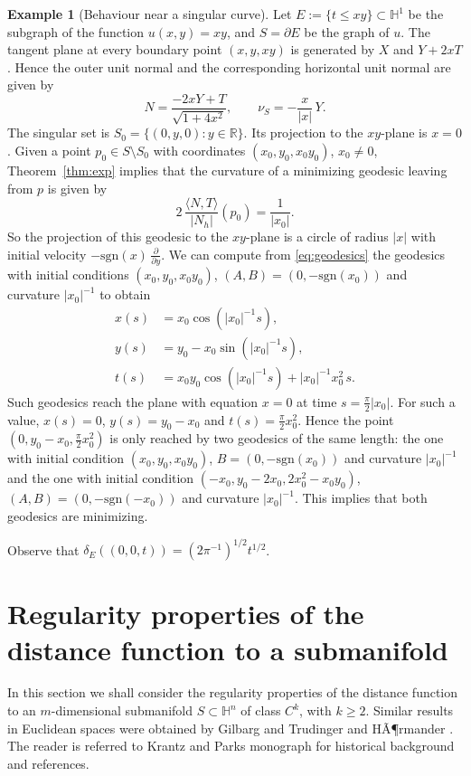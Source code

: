 \documentclass[10pt]{amsart}
\theoremstyle{definition}
\newtheorem{example}[theorem]{Example}
\theoremstyle{remark}
\numberwithin{equation}{section}
\begin{document}
\begin{example}[Behaviour near a singular curve]
\label{ex:curve}
Let $E:=\{t{\leqslant} xy\}\subset{{\mathbb{H}}}^1$ be the subgraph of the function $u(x,y)=xy$, and $S={\partial} E$ be the graph of $u$. The tangent plane at every boundary point $(x,y,xy)$ is generated by $X$ and $Y+2xT$. Hence the outer unit normal and the corresponding horizontal unit normal are given by
\[
N=\frac{-2xY+T}{\sqrt{1+4x^2}},\qquad \nu_S=-\frac{x}{|x|}\,Y.
\]
The singular set is $S_0=\{(0,y,0):y\in{{\mathbb{R}}}\}$. Its projection to the $xy$-plane is $x=0$. Given a point $p_0\in S\setminus S_0$ with coordinates $(x_0,y_0,x_0y_0)$, $x_0\neq 0$, Theorem~\ref{thm:exp} implies that the curvature of a minimizing geodesic leaving from $p$ is given by
\[
2\,\frac{{\langle{N,T}\rangle}}{|N_{h}|}(p_0)=\frac{1}{|x_0|}.
\]
So the projection of this geodesic to the $xy$-plane is a circle of radius $|x|$ with initial velocity $-\text{sgn}(x)\,\tfrac{\partial}{{\partial} y}$. We can compute from \eqref{eq:geodesics} the geodesics with initial conditions $(x_0,y_0,x_0y_0)$, $(A,B)=(0,-\text{sgn}(x_0))$ and curvature $|x_0|^{-1}$ to obtain
\begin{align*}
x(s)&=x_0\cos(|x_0|^{-1}s),
\\
y(s)&=y_0-x_0\sin(|x_0|^{-1}s),
\\
t(s)&=x_0y_0\cos(|x_0|^{-1}s)+|x_0|^{-1}x_0^2\,s.
\end{align*}
Such geodesics reach the plane with equation $x=0$ at time $s=\tfrac{\pi}{2}|x_0|$. For such a value, $x(s)=0$, $y(s)=y_0-x_0$ and $t(s)=\tfrac{\pi}{2}x_0^2$. Hence the point $(0,y_0-x_0,\tfrac{\pi}{2}x_0^2)$ is only reached by two geodesics of the same length: the one with initial condition $(x_0,y_0,x_0y_0)$, $B=(0,-\text{sgn}(x_0))$ and curvature $|x_0|^{-1}$ and the one with initial condition $(-x_0,y_0-2x_0,2x_0^2-x_0y_0)$, $(A,B)=(0,-\text{sgn}(-x_0))$ and curvature $|x_0|^{-1}$. This implies that both geodesics are minimizing.

Observe that $\delta_E((0,0,t))=(2\pi^{-1})^{1/2}t^{1/2}$.
\end{example}

\section{Regularity properties of the distance function to a submanifold}
\label{sec:distsm}

In this section we shall consider the regularity properties of the distance function to an $m$-dimensional submanifold $S\subset{{\mathbb{H}}}^n$ of class $C^k$, with $k{\geqslant} 2$. Similar results in Euclidean spaces were obtained by Gilbarg and Trudinger \cite[\S~14.6]{MR1814364} and HÃ¶rmander \cite[p.~50]{MR0203075}. The reader is referred to Krantz and Parks monograph \cite[\S~4.4]{MR1894435} for historical background and references.
\end{document}

